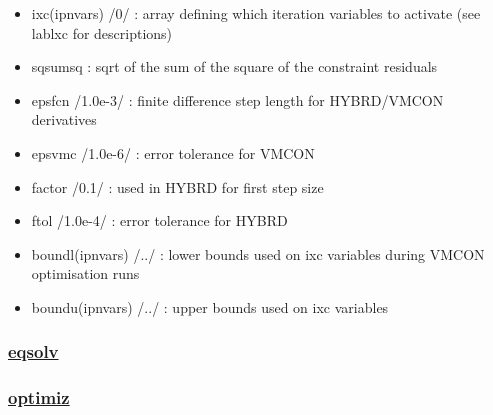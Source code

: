 \documentclass[]{article}
\begin{document}
\begin{itemize}
\begin{itemize}
    (71) ensure that neomp = separatrix density (nesep) x neratio
  \item
    (72) central solenoid Tresca stress limit (itv 123 foh\_stress)
  \item
    (73) Psep \textgreater{}= Plh + Paux (itv 137 (fplhsep))
  \item
    (74) TFC quench \textless{} tmax\_croco (itv 141 (fcqt))
  \item
    (75) TFC current/copper area \textless{} Maximum (itv 143
    f\_copperA\_m2)
  \item
    (76) Eich critical separatrix density
  \item
    (77) TF coil current per turn upper limit
  \item
    (78) Reinke criterion impurity fraction lower limit (itv 147
    freinke)
  \item
    (79) Peak CS field upper limit (itv 149 fbmaxcs)
  \item
    (80) Divertor power lower limit pdivt (itv 153 fpdivlim)
  \item
    (81) Ne(0) \textgreater{} ne(ped) constraint (itv 154 fne0)
  \end{itemize}
\item
  ixc(ipnvars) /0/ : array defining which iteration variables to
  activate (see lablxc for descriptions)
\item
  sqsumsq : sqrt of the sum of the square of the constraint residuals
\item
  epsfcn /1.0e-3/ : finite difference step length for HYBRD/VMCON
  derivatives
\item
  epsvmc /1.0e-6/ : error tolerance for VMCON
\item
  factor /0.1/ : used in HYBRD for first step size
\item
  ftol /1.0e-4/ : error tolerance for HYBRD
\item
  boundl(ipnvars) /../ : lower bounds used on ixc variables during VMCON
  optimisation runs
\item
  boundu(ipnvars) /../ : upper bounds used on ixc variables
\end{itemize}

\subsubsection{\texorpdfstring{\href{eqsolv.html}{eqsolv}}{eqsolv}}\label{eqsolv}

\subsubsection{\texorpdfstring{\href{optimiz.html}{optimiz}}{optimiz}}\label{optimiz}
\end{document}
